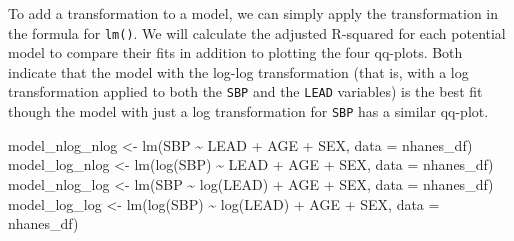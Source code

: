 \documentclass[
  letterpaper,
]{krantz}
\makeatletter
\newenvironment{Shaded}{\begin{snugshade}}{\end{snugshade}}
\newcommand{\AttributeTok}[1]{\textcolor[rgb]{0.40,0.45,0.13}{#1}}
\newcommand{\CommentTok}[1]{\textcolor[rgb]{0.37,0.37,0.37}{#1}}
\newcommand{\FunctionTok}[1]{\textcolor[rgb]{0.28,0.35,0.67}{#1}}
\newcommand{\NormalTok}[1]{\textcolor[rgb]{0.00,0.23,0.31}{#1}}
\newcommand{\OtherTok}[1]{\textcolor[rgb]{0.00,0.23,0.31}{#1}}
\newcommand{\SpecialCharTok}[1]{\textcolor[rgb]{0.37,0.37,0.37}{#1}}
\newenvironment{kframe}{%
\medskip{}
\setlength{\fboxsep}{.8em}
 \def\at@end@of@kframe{}%
 \ifinner\ifhmode%
  \def\at@end@of@kframe{\end{minipage}}%
  \begin{minipage}{\columnwidth}%
 \fi\fi%
 \def\FrameCommand##1{\hskip\@totalleftmargin \hskip-\fboxsep
 \colorbox{shadecolor}{##1}\hskip-\fboxsep
     \hskip-\linewidth \hskip-\@totalleftmargin \hskip\columnwidth}%
 \MakeFramed {\advance\hsize-\width
   \@totalleftmargin\z@ \linewidth\hsize
   \@setminipage}}%
 {\par\unskip\endMakeFramed%
 \at@end@of@kframe}
\renewenvironment{Shaded}{\begin{kframe}}{\end{kframe}}
\makeatother
\begin{document}
To add a transformation to a model, we can simply apply the
transformation in the formula for \texttt{lm()}. We will calculate the
adjusted R-squared for each potential model to compare their fits in
addition to plotting the four qq-plots. Both indicate that the model
with the log-log transformation (that is, with a log transformation
applied to both the \texttt{SBP} and the \texttt{LEAD} variables) is the
best fit though the model with just a log transformation for
\texttt{SBP} has a similar qq-plot.

\begin{Shaded}
\begin{Highlighting}[]
\NormalTok{model\_nlog\_nlog }\OtherTok{\textless{}{-}} \FunctionTok{lm}\NormalTok{(SBP }\SpecialCharTok{\textasciitilde{}}\NormalTok{ LEAD }\SpecialCharTok{+}\NormalTok{ AGE }\SpecialCharTok{+}\NormalTok{ SEX, }\AttributeTok{data =}\NormalTok{ nhanes\_df)}
\NormalTok{model\_log\_nlog }\OtherTok{\textless{}{-}} \FunctionTok{lm}\NormalTok{(}\FunctionTok{log}\NormalTok{(SBP) }\SpecialCharTok{\textasciitilde{}}\NormalTok{ LEAD }\SpecialCharTok{+}\NormalTok{ AGE }\SpecialCharTok{+}\NormalTok{ SEX, }\AttributeTok{data =}\NormalTok{ nhanes\_df)}
\NormalTok{model\_nlog\_log }\OtherTok{\textless{}{-}} \FunctionTok{lm}\NormalTok{(SBP }\SpecialCharTok{\textasciitilde{}} \FunctionTok{log}\NormalTok{(LEAD) }\SpecialCharTok{+}\NormalTok{ AGE }\SpecialCharTok{+}\NormalTok{ SEX, }\AttributeTok{data =}\NormalTok{ nhanes\_df)}
\NormalTok{model\_log\_log }\OtherTok{\textless{}{-}} \FunctionTok{lm}\NormalTok{(}\FunctionTok{log}\NormalTok{(SBP) }\SpecialCharTok{\textasciitilde{}} \FunctionTok{log}\NormalTok{(LEAD) }\SpecialCharTok{+}\NormalTok{ AGE }\SpecialCharTok{+}\NormalTok{ SEX, }
                    \AttributeTok{data =}\NormalTok{ nhanes\_df)}
\end{Highlighting}
\end{Shaded}

\begin{Shaded}
\end{Shaded}
\end{document}
